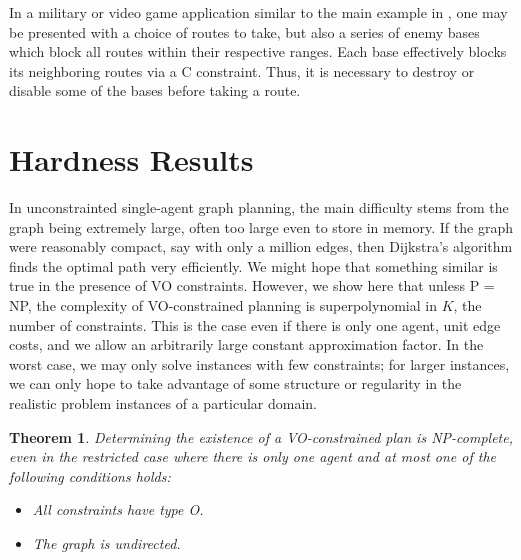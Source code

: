 \documentclass[letterpaper]{article}
\newtheorem{thm}{Theorem}
\begin{document}
In a military or video game application similar to the main example in \cite{karaman2011linear}, one may be presented with a choice of routes to take, but also a series of enemy bases which block all routes within their respective ranges. Each base effectively blocks its neighboring routes via a C constraint. Thus, it is necessary to destroy or disable some of the bases before taking a route.


\section{Hardness Results}

In unconstrainted single-agent graph planning, the main difficulty stems from the graph being extremely large, often too large even to store in memory. If the graph were reasonably compact, say with only a million edges, then Dijkstra's algorithm finds the optimal path very efficiently. We might hope that something similar is true in the presence of VO constraints. However, we show here that unless P = NP, the complexity of VO-constrained planning is superpolynomial in $K$, the number of constraints. This is the case even if there is only one agent, unit edge costs, and we allow an arbitrarily large constant approximation factor. In the worst case, we may only solve instances with few constraints; for larger instances, we can only hope to take advantage of some structure or regularity in the realistic problem instances of a particular domain.

\begin{thm}
\label{NP1}
Determining the existence of a VO-constrained plan is NP-complete, even in the restricted case where there is only one agent and at most one of the following conditions holds:
\begin{itemize}
\item All constraints have type O.
\item The graph is undirected.
\end{itemize}
\end{thm}
\end{document}
